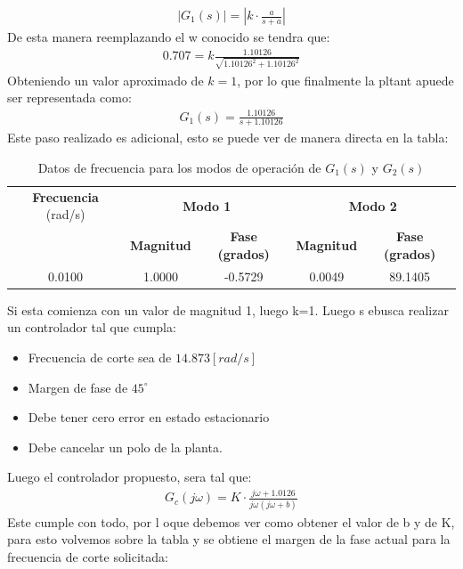 \documentclass[
  11pt,
  letterpaper,
   addpoints,
   answers
  ]{exam}
\begin{document}
\begin{questions}
\begin{solution}
\begin{align}
    |G_{1}(s)| = \left| k \cdot \frac{a}{s+a}\right| 
\end{align}
De esta manera reemplazando el w conocido se tendra que:
\begin{align}
    0.707 = k\frac{1.10126}{\sqrt{1.10126^{2} + 1.10126^{2}}}
\end{align}
Obteniendo un valor aproximado de $k=1$, por lo que finalmente la pltant apuede ser representada como:
\begin{align}
    G_{1}(s) = \frac{1.10126}{s+1.10126}
\end{align}
Este paso realizado es adicional, esto se puede ver de manera directa en la tabla:
\begin{table}[H]
    \centering
    \footnotesize
    \begin{tabular}{|c|c|c|c|c|}
    \hline
    \textbf{Frecuencia} (rad/s) & \multicolumn{2}{c|}{\textbf{Modo 1}} & \multicolumn{2}{c|}{\textbf{Modo 2}} \\
    \cline{2-5}
    & \textbf{Magnitud} & \textbf{Fase (grados)} & \textbf{Magnitud} & \textbf{Fase (grados)} \\
    \hline
    0.0100 & 1.0000 & -0.5729 & 0.0049 & 89.1405 \\
    \hline
    \end{tabular}
    \caption{Datos de frecuencia para los modos de operación de $G_1(s)$ y $G_2(s)$}
\end{table}
Si esta comienza con un valor de magnitud 1, luego k=1. Luego s ebusca realizar un controlador tal que cumpla:
\begin{itemize}
    \item Frecuencia de corte sea de $14.873 [rad/s]$
    \item Margen de fase de $45^{\circ}$
    \item Debe tener cero error en estado estacionario
    \item Debe cancelar un polo de la planta.
\end{itemize}
Luego el controlador propuesto, sera tal que:
\begin{align}
    G_{c}(j\omega) = K \cdot \frac{j\omega + 1.0126}{j\omega (j\omega + b)}
\end{align}
Este cumple con todo, por l oque debemos ver como obtener el valor de b y de K, para esto volvemos sobre la tabla y se obtiene el margen de la fase actual para la frecuencia de corte solicitada:
\begin{table}[H]
    \centering
    \footnotesize
    \begin{tabular}{|c|c|c|c|c|}

\end{tabular}
\end{table}
\end{solution}
\end{questions}
\end{document}
